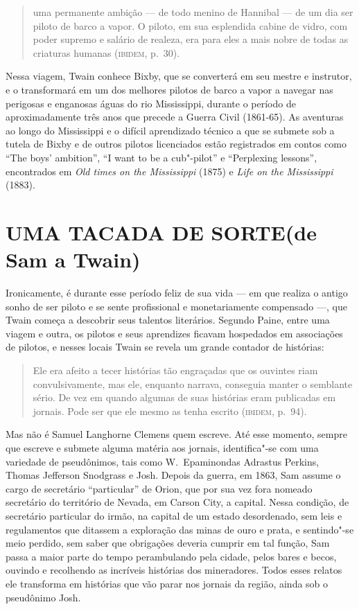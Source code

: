 \begin{quote}
uma permanente ambição
--- de todo menino de Hannibal --- de um dia ser piloto de barco a vapor. O
piloto, em sua esplendida cabine de vidro, com poder supremo e salário de
realeza, era para eles a mais nobre de todas as criaturas
humanas (\textsc{ibidem}, p.~30).
\end{quote}

Nessa viagem, Twain conhece Bixby, que se converterá em seu mestre e
instrutor, e o transformará em um dos melhores pilotos de barco a vapor a
navegar nas perigosas e enganosas águas do rio Mississippi, durante o
período de aproximadamente três anos que precede a Guerra Civil
(1861-65). As aventuras ao longo do Mississippi e o difícil aprendizado
técnico a que se submete sob a tutela de Bixby e de outros pilotos
licenciados estão registrados em contos como ``The
boys' ambition'', ``I want to be a cub"-pilot'' e ``Perplexing
lessons'', encontrados em \textit{Old times on the Mississippi}
(1875) e \textit{Life on the Mississippi} (1883).

\section{UMA TACADA DE SORTE\break (de Sam a Twain)}

Ironicamente, é durante esse período feliz de sua vida --- em que realiza
o antigo sonho de ser piloto e se sente profissional e monetariamente
compensado ---, que Twain começa a descobrir seus talentos literários.
Segundo Paine, entre uma viagem e outra, os pilotos e seus aprendizes
ficavam hospedados em associações de pilotos, e nesses locais Twain se
revela um grande contador de histórias:

\begin{quote}
Ele era afeito a
tecer histórias tão engraçadas que os ouvintes riam convulsivamente, mas
ele, enquanto narrava, conseguia manter o semblante sério. De vez em
quando algumas de suas histórias eram publicadas em jornais. Pode ser
que ele mesmo as tenha escrito (\textsc{ibidem}, p.~94).
\end{quote}

Mas não é Samuel Langhorne Clemens quem escreve. Até esse momento, sempre que
escreve e submete alguma matéria aos jornais, identifica"-se com uma
variedade de pseudônimos, tais como W.~Epaminondas Adrastus Perkins,
Thomas Jefferson Snodgrass e Josh. Depois da guerra, em 1863, Sam assume o
cargo de secretário ``particular'' de
Orion, que por sua vez fora nomeado secretário do território de Nevada,
em Carson City, a capital. Nessa condição, de secretário particular do
irmão, na capital de um estado desordenado, sem leis e regulamentos que
ditassem a exploração das minas de ouro e prata, e sentindo"-se meio
perdido, sem saber que obrigações deveria cumprir em tal função, Sam passa
a maior parte do tempo perambulando pela cidade, pelos bares e becos,
ouvindo e recolhendo as incríveis histórias dos mineradores. Todos
esses relatos ele transforma em histórias que vão parar nos jornais da
região, ainda sob o pseudônimo Josh.

